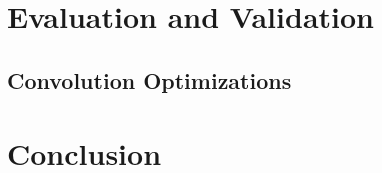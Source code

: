 \documentclass[conference]{IEEEtran}
\begin{document}
\section{Evaluation and Validation}
\subsection{Convolution Optimizations}



\section{Conclusion}





\end{document}
